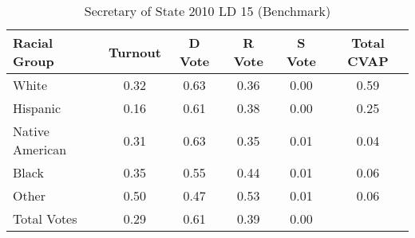 \begin{table}[htb]
\begin{center}
\caption{Secretary of State 2010 LD 15 (Benchmark)}
\label{sos10_cvap_ld_15_benchmark}
\begin{tabular}{lccccc}
  \hline
Racial Group & Turnout & D Vote & R Vote & S Vote & Total CVAP \\ 
  \hline
White & 0.32 & 0.63 & 0.36 & 0.00 & 0.59 \\ 
  Hispanic & 0.16 & 0.61 & 0.38 & 0.00 & 0.25 \\ 
  Native American & 0.31 & 0.63 & 0.35 & 0.01 & 0.04 \\ 
  Black & 0.35 & 0.55 & 0.44 & 0.01 & 0.06 \\ 
  Other & 0.50 & 0.47 & 0.53 & 0.01 & 0.06 \\ 
  Total Votes & 0.29 & 0.61 & 0.39 & 0.00 &  \\ 
   \hline
\end{tabular}
\end{center}
\end{table}
